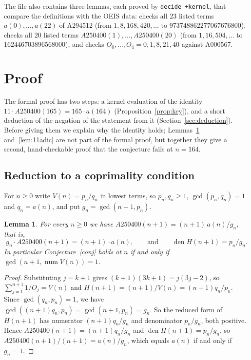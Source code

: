 \documentclass[11pt]{amsart}
\theoremstyle{plain}
\newtheorem{lemma}[theorem]{Lemma}
\theoremstyle{definition}
\DeclareMathOperator{\num}{num}
\DeclareMathOperator{\den}{den}
\begin{document}
The file also contains three lemmas, each proved by \texttt{decide +kernel}, that compare the definitions with the OEIS data:  checks all $23$ listed terms $a(0),\dots,a(22)$ of A294512 (from $1,8,168,420,\dots$ to $973748862277067676800$),  checks all $20$ listed terms $A250400(1),\dots,A250400(20)$ (from $1,16,504,\dots$ to $162446703896568000$), and  checks $O_0,\dots,O_4=0,1,8,21,40$ against A000567.

\section{Proof}\label{sec:proof}

The formal proof has two steps: a kernel evaluation of the identity $11\cdot A250400(165)=165\cdot a(164)$ (Proposition~\ref{prop:key}), and a short deduction of the negation of the statement from it (Section~\ref{sec:deduction}). Before giving them we explain why the identity holds; Lemmas~\ref{lem:reduction} and~\ref{lem:11adic} are not part of the formal proof, but together they give a second, hand-checkable proof that the conjecture fails at $n=164$.

\subsection{Reduction to a coprimality condition}

For $n\ge0$ write $V(n)=p_n/q_n$ in lowest terms, so $p_n,q_n\ge1$, $\gcd(p_n,q_n)=1$ and $q_n=a(n)$, and put $g_n=\gcd(n+1,p_n)$.

\begin{lemma}\label{lem:reduction}
For every $n\ge0$ we have $A250400(n+1)=(n+1)\,a(n)/g_n$, that is,
\[
  g_n\cdot A250400(n+1)=(n+1)\cdot a(n),\qquad\text{and}\qquad \den H(n+1)=p_n/g_n.
\]
In particular Conjecture~\ref{conj} holds at $n$ if and only if $\gcd(n+1,\num V(n))=1$.
\end{lemma}

\begin{proof}
Substituting $j=k+1$ gives $(k+1)(3k+1)=j(3j-2)$, so $\sum_{j=1}^{n+1}1/O_j=V(n)$ and $H(n+1)=(n+1)/V(n)=(n+1)q_n/p_n$.
Since $\gcd(q_n,p_n)=1$, we have $\gcd((n+1)q_n,p_n)=\gcd(n+1,p_n)=g_n$. So the reduced form of $H(n+1)$ has numerator $(n+1)q_n/g_n$ and denominator $p_n/g_n$, both positive. Hence $A250400(n+1)=(n+1)q_n/g_n$ and $\den H(n+1)=p_n/g_n$, so $A250400(n+1)/(n+1)=a(n)/g_n$, which equals $a(n)$ if and only if $g_n=1$.
\end{proof}
\end{document}
